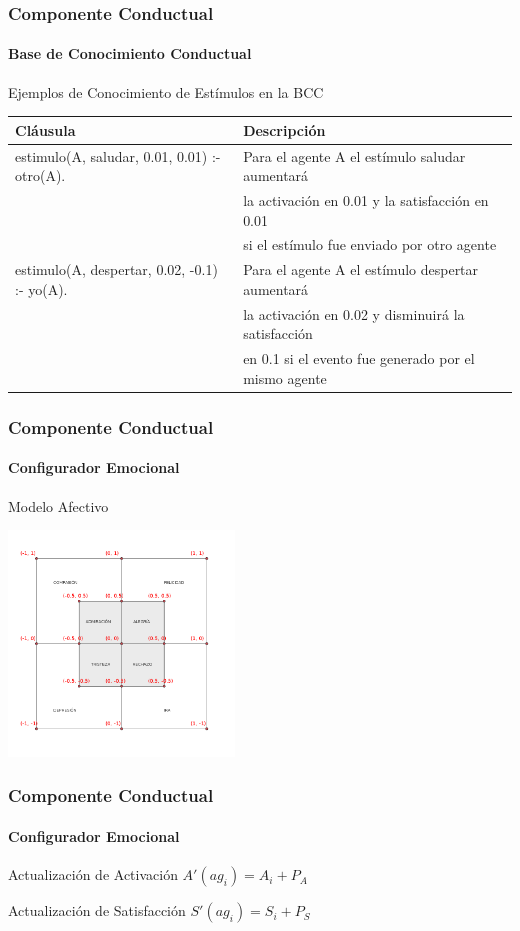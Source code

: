 \documentclass{beamer}
\begin{document}
\begin{frame}
\frametitle{Componente Conductual}
\framesubtitle{Base de Conocimiento Conductual}
\centering
Ejemplos de Conocimiento de Estímulos en la BCC
\begin{table}[!ht]
\centering
\tiny
\begin{tabular}{ll}
\hline
\scriptsize \bfseries Cláusula & \scriptsize \bfseries Descripción \\
\hline
\hline
estimulo(A, saludar, 0.01, 0.01) :- otro(A). & Para el agente A el estímulo saludar aumentará \\ & la activación en 0.01 y la satisfacción en 0.01 \\ & si el estímulo fue enviado por otro agente \\ \hline
estimulo(A, despertar, 0.02, -0.1) :- yo(A). & Para el agente A el estímulo despertar aumentará \\ & la activación en 0.02 y disminuirá la satisfacción \\ & en 0.1 si el evento fue generado por el mismo agente \\
\hline
\end{tabular}
\end{table}
\end{frame}

\begin{frame}
\frametitle{Componente Conductual}
\framesubtitle{Configurador Emocional}
\centering
Modelo Afectivo

\includegraphics[width=6cm]{ilustraciones/modelo-afectivo-propuesto}
\end{frame}

\begin{frame}
\frametitle{Componente Conductual}
\framesubtitle{Configurador Emocional}
\centering

\begin{exampleblock}{Actualización de Activación}
$A'(ag_i) = A_i + P_A$
\end{exampleblock}

\begin{alertblock}{Actualización de Satisfacción}
$ S'(ag_i) = S_i + P_S$
\end{alertblock}

\end{frame}
\end{document}
